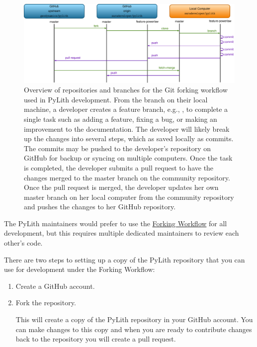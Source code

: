 \begin{figure}[htbp]
  \includegraphics[scale=0.7]{developer/figs/gitworkflow_branch}
  \caption{Overview of repositories and branches for the Git forking
    workflow used in PyLith development. From the 
    branch on their local machine, a developer creates a feature
    branch, e.g., , to complete a single
    task such as adding a feature, fixing a bug, or making an
    improvement to the documentation. The developer will likely break
    up the changes into several steps, which as saved locally as
    commits. The commits may be pushed to the developer's repository
    on GitHub for backup or syncing on multiple computers. Once the
    task is completed, the developer submits a pull request to have
    the changes merged to the master branch on the community
    repository. Once the pull request is merged, the developer updates
    her own master branch on her local computer from the community
    repository and pushes the changes to her GitHub repository.}
  \label{fig:developer:git:branch}
\end{figure}

The PyLith maintainers would prefer to use the
\href{https://www.atlassian.com/git/tutorials/comparing-workflows/forking-workflow}{Forking
  Workflow} for all development, but this requires multiple dedicated
maintainers to review each other's code.

There are two steps to setting up a copy of the PyLith repository that
you can use for development under the Forking Workflow:
\begin{enumerate}
\item Create a GitHub account.
\item Fork the  repository.

  This will create a copy of the PyLith repository in your GitHub
  account. You can make changes to this copy and when you are ready to
  contribute changes back to the 
  repository you will create a pull request.
\end{enumerate}

